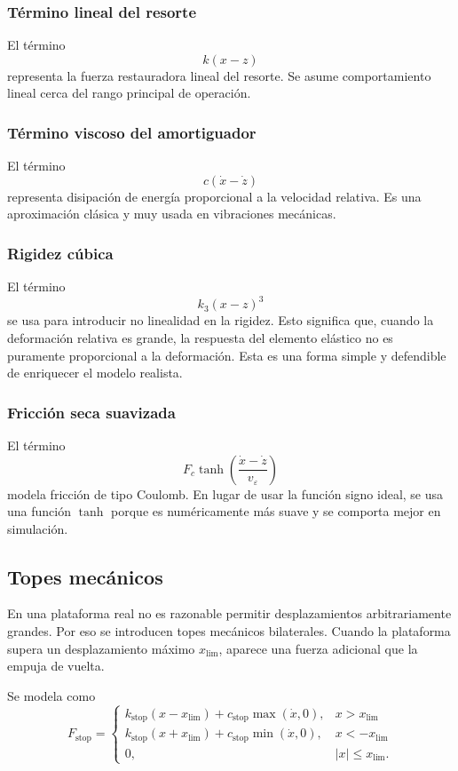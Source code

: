 \documentclass[11pt]{article}
\begin{document}
\subsubsection{T\'ermino lineal del resorte}

El t\'ermino
\[
k(x-z)
\]
representa la fuerza restauradora lineal del resorte. Se asume comportamiento lineal cerca del rango principal de operaci\'on.

\subsubsection{T\'ermino viscoso del amortiguador}

El t\'ermino
\[
c(\dot{x}-\dot{z})
\]
representa disipaci\'on de energ\'ia proporcional a la velocidad relativa. Es una aproximaci\'on cl\'asica y muy usada en vibraciones mec\'anicas.

\subsubsection{Rigidez c\'ubica}

El t\'ermino
\[
k_3(x-z)^3
\]
se usa para introducir no linealidad en la rigidez. Esto significa que, cuando la deformaci\'on relativa es grande, la respuesta del elemento el\'astico no es puramente proporcional a la deformaci\'on. Esta es una forma simple y defendible de enriquecer el modelo realista.

\subsubsection{Fricci\'on seca suavizada}

El t\'ermino
\[
F_c\tanh\left(\frac{\dot{x}-\dot{z}}{v_\varepsilon}\right)
\]
modela fricci\'on de tipo Coulomb. En lugar de usar la funci\'on signo ideal, se usa una funci\'on $\tanh$ porque es num\'ericamente m\'as suave y se comporta mejor en simulaci\'on.

\subsection{Topes mec\'anicos}

En una plataforma real no es razonable permitir desplazamientos arbitrariamente grandes. Por eso se introducen topes mec\'anicos bilaterales. Cuando la plataforma supera un desplazamiento m\'aximo $x_{\text{lim}}$, aparece una fuerza adicional que la empuja de vuelta.

Se modela como
\begin{equation}
F_{\text{stop}}=
\begin{cases}
k_{\text{stop}}(x-x_{\text{lim}}) + c_{\text{stop}}\max(\dot{x},0), & x>x_{\text{lim}}\\
k_{\text{stop}}(x+x_{\text{lim}}) + c_{\text{stop}}\min(\dot{x},0), & x<-x_{\text{lim}}\\
0, & |x|\le x_{\text{lim}}.
\end{cases}
\label{eq:fstop}
\end{equation}
\end{document}
